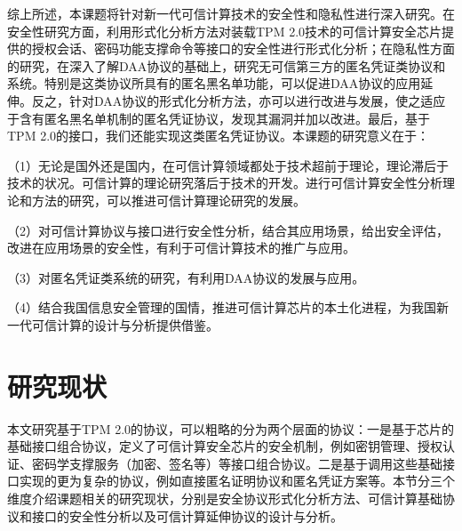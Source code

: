 

综上所述，本课题将针对新一代可信计算技术的安全性和隐私性进行深入研究。在安全性研究方面，利用形式化分析方法对装载TPM 2.0技术的可信计算安全芯片提供的授权会话、密码功能支撑命令等接口的安全性进行形式化分析；在隐私性方面的研究，在深入了解DAA协议的基础上，研究无可信第三方的匿名凭证类协议和系统。特别是这类协议所具有的匿名黑名单功能，可以促进DAA协议的应用延伸。反之，针对DAA协议的形式化分析方法，亦可以进行改进与发展，使之适应于含有匿名黑名单机制的匿名凭证协议，发现其漏洞并加以改进。最后，基于TPM 2.0的接口，我们还能实现这类匿名凭证协议。本课题的研究意义在于：

（1）无论是国外还是国内，在可信计算领域都处于技术超前于理论，理论滞后于技术的状况。可信计算的理论研究落后于技术的开发。进行可信计算安全性分析理论和方法的研究，可以推进可信计算理论研究的发展。

（2）对可信计算协议与接口进行安全性分析，结合其应用场景，给出安全评估，改进在应用场景的安全性，有利于可信计算技术的推广与应用。

（3）对匿名凭证类系统的研究，有利用DAA协议的发展与应用。

（4）结合我国信息安全管理的国情，推进可信计算芯片的本土化进程，为我国新一代可信计算的设计与分析提供借鉴。

\section{研究现状} \label{sec:status}

本文研究基于TPM 2.0的协议，可以粗略的分为两个层面的协议：一是基于芯片的基础接口组合协议，定义了可信计算安全芯片的安全机制，例如密钥管理、授权认证、密码学支撑服务（加密、签名等）等接口组合协议。二是基于调用这些基础接口实现的更为复杂的协议，例如直接匿名证明协议和匿名凭证方案等。本节分三个维度介绍课题相关的研究现状，分别是安全协议形式化分析方法、可信计算基础协议和接口的安全性分析以及可信计算延伸协议的设计与分析。

